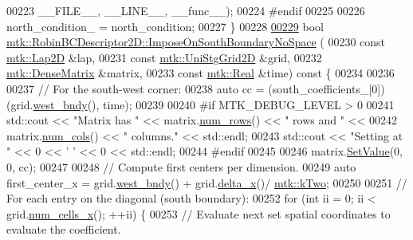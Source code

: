 \begin{DoxyCode}
00223                       \_\_FILE\_\_, \_\_LINE\_\_, \_\_func\_\_);
00224 \textcolor{preprocessor}{  #endif}
00225 
00226   north\_condition\_ = north\_condition;
00227 \}
00228 
\hypertarget{mtk__robin__bc__descriptor__2d_8cc_source_l00229}{}\hyperlink{classmtk_1_1RobinBCDescriptor2D_a82159bcca93555114532c5fa4d0fb3db}{00229} \textcolor{keywordtype}{bool} \hyperlink{classmtk_1_1RobinBCDescriptor2D_a82159bcca93555114532c5fa4d0fb3db}{mtk::RobinBCDescriptor2D::ImposeOnSouthBoundaryNoSpace}
      (
00230     \textcolor{keyword}{const} \hyperlink{classmtk_1_1Lap2D}{mtk::Lap2D} &lap,
00231     \textcolor{keyword}{const} \hyperlink{classmtk_1_1UniStgGrid2D}{mtk::UniStgGrid2D} &grid,
00232     \hyperlink{classmtk_1_1DenseMatrix}{mtk::DenseMatrix} &matrix,
00233     \textcolor{keyword}{const} \hyperlink{group__c01-roots_gac080bbbf5cbb5502c9f00405f894857d}{mtk::Real} &time)\textcolor{keyword}{ const }\{
00234 
00236 
00237   \textcolor{comment}{// For the south-west corner:}
00238   \textcolor{keyword}{auto} cc = (south\_coefficients\_[0])(grid.\hyperlink{classmtk_1_1UniStgGrid2D_af2b1712387ded85edaf2b64617d3fc13}{west\_bndy}(), time);
00239 
00240 \textcolor{preprocessor}{  #if MTK\_DEBUG\_LEVEL > 0}
00241   std::cout << \textcolor{stringliteral}{"Matrix has "} << matrix.\hyperlink{classmtk_1_1DenseMatrix_a53f3afb3b6a8d21854458aaa9663cc74}{num\_rows}() << \textcolor{stringliteral}{" rows and "} <<
00242     matrix.\hyperlink{classmtk_1_1DenseMatrix_a41747502d468c6728a4be31501b16e0e}{num\_cols}() << \textcolor{stringliteral}{" columns."} << std::endl;
00243   std::cout << \textcolor{stringliteral}{"Setting at "} << 0 << \textcolor{charliteral}{' '} << 0 << std::endl;
00244 \textcolor{preprocessor}{  #endif}
00245 
00246   matrix.\hyperlink{classmtk_1_1DenseMatrix_a784ce5784109ac86bfb9d8562b334b13}{SetValue}(0, 0, cc);
00247 
00248   \textcolor{comment}{// Compute first centers per dimension.}
00249   \textcolor{keyword}{auto} first\_center\_x = grid.\hyperlink{classmtk_1_1UniStgGrid2D_af2b1712387ded85edaf2b64617d3fc13}{west\_bndy}() + grid.\hyperlink{classmtk_1_1UniStgGrid2D_aca4710004c4a7da6a9e8fd6ab32a691f}{delta\_x}()/
      \hyperlink{group__c01-roots_gaf39c2d851a2db744f4feb1c5ab3ec2cf}{mtk::kTwo};
00250 
00251   \textcolor{comment}{// For each entry on the diagonal (south boundary):}
00252   \textcolor{keywordflow}{for} (\textcolor{keywordtype}{int} ii = 0; ii < grid.\hyperlink{classmtk_1_1UniStgGrid2D_a2d182866a398aba8e4829590e85bf939}{num\_cells\_x}(); ++ii) \{
00253     \textcolor{comment}{// Evaluate next set spatial coordinates to evaluate the coefficient.}

\end{DoxyCode}
